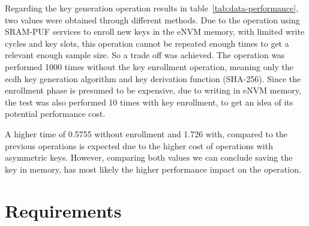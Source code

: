 

Regarding the key generation operation results in table~\ref{tab:data-performance}, two values were obtained through different methods. Due to the operation using SRAM-PUF services to enroll new keys in the eNVM memory, with limited write cycles and key slots, this operation cannot be repeated enough times to get a relevant enough sample size.
So a trade off was achieved. The operation was performed 1000 times without the key enrollment operation, meaning only the ecdh key generation algorithm and key derivation function (SHA-256).
Since the enrollment phase is presumed to be expensive, due to writing in eNVM memory, the test was also performed 10 times with key enrollment, to get an idea of its potential performance cost.

A higher time of 0.5755 without enrollment and 1.726 with, compared to the previous operations is expected due to the higher cost of operations with asymmetric keys.
However, comparing both values we can conclude saving the key in memory, has most likely the higher performance impact on the operation.

\section{Requirements}\label{chap:evaluation:requirements}
